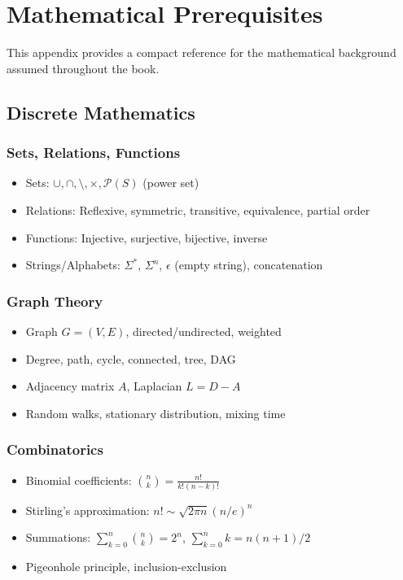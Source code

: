 
\chapter{Mathematical Prerequisites}
\label{app:prereqs}

This appendix provides a compact reference for the mathematical background assumed throughout the book.

\section{Discrete Mathematics}

\subsection{Sets, Relations, Functions}
\begin{itemize}
\item Sets: $\cup, \cap, \setminus, \times, \mathcal{P}(S)$ (power set)
\item Relations: Reflexive, symmetric, transitive, equivalence, partial order
\item Functions: Injective, surjective, bijective, inverse
\item Strings/Alphabets: $\Sigma^*$, $\Sigma^n$, $\epsilon$ (empty string), concatenation
\end{itemize}

\subsection{Graph Theory}
\begin{itemize}
\item Graph $G=(V,E)$, directed/undirected, weighted
\item Degree, path, cycle, connected, tree, DAG
\item Adjacency matrix $A$, Laplacian $L = D - A$
\item Random walks, stationary distribution, mixing time
\end{itemize}

\subsection{Combinatorics}
\begin{itemize}
\item Binomial coefficients: $\binom{n}{k} = \frac{n!}{k!(n-k)!}$
\item Stirling's approximation: $n! \sim \sqrt{2\pi n} (n/e)^n$
\item Summations: $\sum_{k=0}^n \binom{n}{k} = 2^n$, $\sum_{k=0}^n k = n(n+1)/2$
\item Pigeonhole principle, inclusion-exclusion
\end{itemize}

